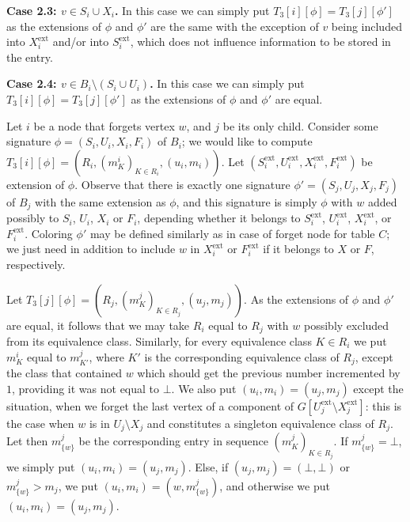 \documentclass[a4paper,11pt]{article}
\theoremstyle{definition}
\theoremstyle{remark}
\newcommand{\ext}{\textrm{ext}}
\begin{document}
\vskip 0.1cm {\bf{Case 2.3: $v\in S_i\cup X_i$.}} In this case we can
simply put $T_3[i][\phi]=T_3[j][\phi']$ as the extensions of $\phi$
and $\phi'$ are the same with the exception of $v$ being included into
$X^{\ext}_i$ and/or into $S^{\ext}_i$, which does not influence
information to be stored in the entry.

\vskip 0.1cm

{\bf{Case 2.4: $v\in B_i\setminus (S_i\cup U_i)$.}} In this case we can simply put
$T_3[i][\phi]=T_3[j][\phi']$ as the extensions of $\phi$ and $\phi'$ are equal.

\vskip 0.3cm

 Let $i$ be a node that forgets
vertex $w$, and $j$ be its only child.  Consider some signature
$\phi=(S_i,U_i,X_i,F_i)$ of $B_i$; we would like to compute
$T_3[i][\phi]=(R_i,(m^i_K)_{K\in R_i},(u_i,m_i))$.  Let
$(S^{\ext}_i,U^{\ext}_i,X^{\ext}_i,F^{\ext}_i)$ be extension of
$\phi$.  Observe that there is exactly one signature
$\phi'=(S_j,U_j,X_j,F_j)$ of $B_j$ with the same extension as $\phi$,
and this signature is simply $\phi$ with $w$ added possibly to $S_i$,
$U_i$, $X_i$ or $F_i$, depending whether it belongs to $S^{\ext}_i$,
$U^{\ext}_i$, $X^{\ext}_i$, or $F^{\ext}_i$.  Coloring $\phi'$ may be
defined similarly as in case of forget node for table $C$; we just
need in addition to include $w$ in $X^{\ext}_i$ or $F^{\ext}_i$ if it
belongs to $X$ or $F$, respectively.

Let $T_3[j][\phi]=(R_j,(m^j_K)_{K\in R_j},(u_j,m_j))$.  As the extensions
of $\phi$ and $\phi'$ are equal, it follows that we may take $R_i$
equal to $R_j$ with $w$ possibly excluded from its equivalence class.
Similarly, for every equivalence class $K\in R_i$ we put $m^i_K$ equal
to $m^j_{K'}$, where $K'$ is the corresponding equivalence class of
$R_j$, except the class that contained $w$ which should get the
previous number incremented by $1$, providing it was not equal to
$\bot$.  We also put $(u_i,m_i)=(u_j,m_j)$ except the situation, when
we forget the last vertex of a component of $G[U^{\ext}_j\setminus
X^{\ext}_j]$: this is the case when $w$ is in $U_j\setminus X_j$ and
constitutes a singleton equivalence class of $R_j$.  Let then
$m^j_{\{w\}}$ be the corresponding entry in sequence $(m^j_K)_{K\in
  R_j}$.  If $m^j_{\{w\}}=\bot$, we simply put $(u_i,m_i)=(u_j,m_j)$.
Else, if $(u_j,m_j)=(\bot,\bot)$ or $m^j_{\{w\}}>m_j$, we put
$(u_i,m_i)=(w,m^j_{\{w\}})$, and otherwise we put
$(u_i,m_i)=(u_j,m_j)$.

\vskip 0.3cm
\end{document}
